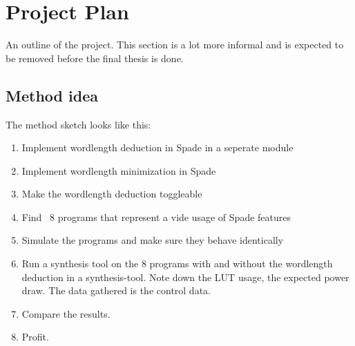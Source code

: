 \documentclass[msc,lith,english]{liuthesis}
\begin{document}
\cite{src:HLSandOpt}



\chapter{Project Plan}
An outline of the project. This section is a lot more informal and is expected to be removed before the final thesis is done.

\section{Method idea}
The method sketch looks like this:
\begin{enumerate}
  \item Implement wordlength deduction in Spade in a seperate module
  \item Implement wordlength minimization in Spade
  \item Make the wordlength deduction toggleable
  \item Find ~8 programs that represent a vide usage of Spade features
  \item Simulate the programs and make sure they behave identically
  \item Run a synthesis tool on the 8 programs with and without the wordlength deduction in a synthesis-tool. Note down the LUT usage, the expected power draw. The data gathered is the control data.
  \item Compare the results.
  \item Profit.
\end{enumerate}
\end{document}
